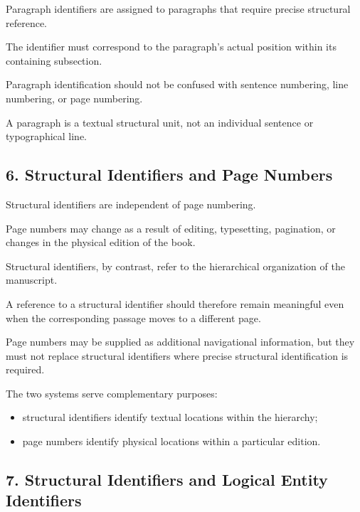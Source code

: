 Paragraph identifiers are assigned
to paragraphs that require precise
structural reference.

The identifier must correspond
to the paragraph's actual position
within its containing subsection.

Paragraph identification should
not be confused with sentence
numbering, line numbering, or
page numbering.

A paragraph is a textual structural
unit, not an individual sentence
or typographical line.


\subsection*{6. Structural Identifiers and Page Numbers}

Structural identifiers are independent
of page numbering.

Page numbers may change as a result
of editing, typesetting, pagination,
or changes in the physical edition
of the book.

Structural identifiers, by contrast,
refer to the hierarchical organization
of the manuscript.

A reference to a structural identifier
should therefore remain meaningful
even when the corresponding passage
moves to a different page.

Page numbers may be supplied as
additional navigational information,
but they must not replace structural
identifiers where precise structural
identification is required.

The two systems serve complementary
purposes:

\begin{itemize}
    \item structural identifiers
    identify textual locations
    within the hierarchy;

    \item page numbers identify
    physical locations within
    a particular edition.
\end{itemize}


\subsection*{7. Structural Identifiers and
Logical Entity Identifiers}

